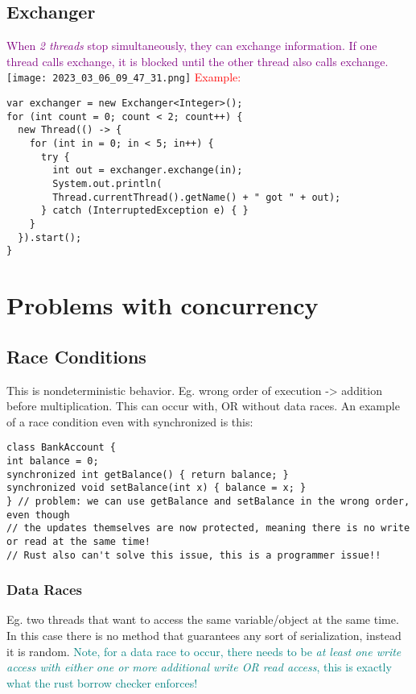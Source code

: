 \documentclass[main.tex,fontsize=8pt,paper=a4,paper=portrait,DIV=calc,]{scrartcl}
\begin{document}
\subsection{Exchanger}
\textcolor{purple}{When \emph{2 threads} stop simultaneously, they can exchange information. If one thread calls exchange, it is blocked until the other thread also calls exchange.}\newline
\texttt{[image: 2023\_03\_06\_09\_47\_31.png]}\newline
\textcolor{red}{Example:}
\begin{lstlisting}
var exchanger = new Exchanger<Integer>();
for (int count = 0; count < 2; count++) {
  new Thread(() -> {
    for (int in = 0; in < 5; in++) {
      try {
        int out = exchanger.exchange(in);
        System.out.println(
        Thread.currentThread().getName() + " got " + out);
      } catch (InterruptedException e) { }
    }
  }).start();
}
\end{lstlisting}

\section{Problems with concurrency}

\subsection{Race Conditions}
This is nondeterministic behavior. \newline
Eg. wrong order of execution -> addition before multiplication.\newline
This can occur with, OR without data races.\newline
An example of a race condition even with synchronized is this:
\begin{lstlisting}
class BankAccount {
int balance = 0;
synchronized int getBalance() { return balance; }
synchronized void setBalance(int x) { balance = x; }
} // problem: we can use getBalance and setBalance in the wrong order, even though
// the updates themselves are now protected, meaning there is no write or read at the same time! 
// Rust also can't solve this issue, this is a programmer issue!!
\end{lstlisting}

\subsubsection{Data Races}
Eg. two threads that want to access the same variable/object at the same time.\newline
In this case there is no method that guarantees any sort of serialization, instead it is random.\newline
\textcolor{teal}{Note, for a data race to occur, there needs to be \emph{at least one write access with either one or more additional write OR read access}, \newline
this is exactly what the rust borrow checker enforces!}\newline
\end{document}
